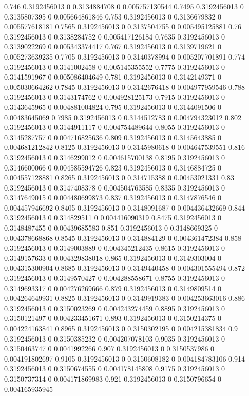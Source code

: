 {0.746 0.3192456013 0 0.3134884708 0 0.005757130544
0.7495 0.3192456013 0 0.3135807395 0 0.005664861846
0.753 0.3192456013 0 0.3136679832 0 0.005577618181
0.7565 0.3192456013 0 0.3137504755 0 0.005495125881
0.76 0.3192456013 0 0.3138284752 0 0.005417126184
0.7635 0.3192456013 0 0.3139022269 0 0.005343374417
0.767 0.3192456013 0 0.3139719621 0 0.005273639235
0.7705 0.3192456013 0 0.3140378994 0 0.005207701891
0.774 0.3192456013 0 0.3141002458 0 0.005145355552
0.7775 0.3192456013 0 0.3141591967 0 0.005086404649
0.781 0.3192456013 0 0.3142149371 0 0.005030664262
0.7845 0.3192456013 0 0.3142676418 0 0.004977959546
0.788 0.3192456013 0 0.3143174762 0 0.004928125173
0.7915 0.3192456013 0 0.3143645965 0 0.004881004824
0.795 0.3192456013 0 0.3144091506 0 0.00483645069
0.7985 0.3192456013 0 0.3144512783 0 0.004794323012
0.802 0.3192456013 0 0.3144911117 0 0.004754489644
0.8055 0.3192456013 0 0.3145287757 0 0.004716825636
0.809 0.3192456013 0 0.3145643885 0 0.004681212842
0.8125 0.3192456013 0 0.3145980618 0 0.004647539551
0.816 0.3192456013 0 0.3146299012 0 0.004615700138
0.8195 0.3192456013 0 0.3146600066 0 0.004585594726
0.823 0.3192456013 0 0.3146884725 0 0.004557128881
0.8265 0.3192456013 0 0.314715388 0 0.00453021331
0.83 0.3192456013 0 0.3147408378 0 0.004504763585
0.8335 0.3192456013 0 0.3147649015 0 0.004480699873
0.837 0.3192456013 0 0.3147876546 0 0.004457946692
0.8405 0.3192456013 0 0.3148091687 0 0.004436432669
0.844 0.3192456013 0 0.314829511 0 0.004416090319
0.8475 0.3192456013 0 0.3148487455 0 0.00439685583
0.851 0.3192456013 0 0.3148669325 0 0.004378668868
0.8545 0.3192456013 0 0.314884129 0 0.004361472384
0.858 0.3192456013 0 0.3149003889 0 0.004345212435
0.8615 0.3192456013 0 0.3149157633 0 0.004329838018
0.865 0.3192456013 0 0.3149303004 0 0.004315300904
0.8685 0.3192456013 0 0.3149440458 0 0.004301555494
0.872 0.3192456013 0 0.3149570427 0 0.004288558671
0.8755 0.3192456013 0 0.3149693317 0 0.004276269666
0.879 0.3192456013 0 0.3149809514 0 0.004264649931
0.8825 0.3192456013 0 0.3149919383 0 0.004253663016
0.886 0.3192456013 0 0.3150023269 0 0.004243274459
0.8895 0.3192456013 0 0.3150121497 0 0.004233451671
0.893 0.3192456013 0 0.3150214375 0 0.004224163841
0.8965 0.3192456013 0 0.3150302195 0 0.004215381834
0.9 0.3192456013 0 0.3150385232 0 0.004207078103
0.9035 0.3192456013 0 0.3150463747 0 0.0041992266
0.907 0.3192456013 0 0.3150537986 0 0.004191802697
0.9105 0.3192456013 0 0.3150608182 0 0.004184783106
0.914 0.3192456013 0 0.3150674555 0 0.004178145808
0.9175 0.3192456013 0 0.3150737314 0 0.004171869983
0.921 0.3192456013 0 0.3150796654 0 0.004165935945
}
